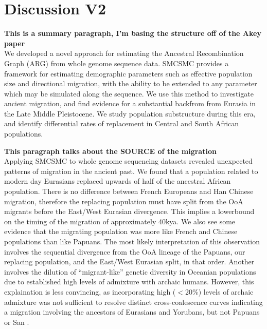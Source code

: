 \documentclass{article}
\begin{document}
\section{Discussion V2}

{\bf This is a summary paragraph, I'm basing the structure off of the Akey paper} \\
We developed a novel approach for estimating the Ancestral Recombination Graph (ARG) from whole genome sequence data. SMCSMC provides a framework for estimating demographic parameters such as effective population size and directional migration, with the ability to be extended to any parameter which may be simulated along the sequence. We use this method to investigate ancient migration, and find evidence for a substantial backfrom from Eurasia in the Late Middle Pleistocene. We study population substructure during this era, and identify differential rates of replacement in Central and South African populations. 


{\bf This paragraph talks about the SOURCE of the migration} \\
Applying SMCSMC to whole genome sequencing datasets revealed unexpected patterns of migration in the ancient past. We found that a population related to modern day Eurasians replaced upwards of half of the ancestral African population. There is no difference between French Europeans and Han Chinese migration, therefore the replacing population must have split from the OoA migrants before the East/West Eurasian divergence. This implies a lowerbound on the timing of the migration of approximately 40kya. We also see some evidence that the migrating population was more like French and Chinese populations than like Papuans. The most likely interpretation of this observation involves the sequential divergence from the OoA lineage of the Papuans, our replacing population, and the East/West Eurasian split, in that order. Another involves the dilution of ``migrant-like'' genetic diversity in Oceanian populations due to established high levels of admixture with archaic humans. However, this explaination is less convincing, as incorporating high ($<$20\%) levels of archaic admixture was not sufficient to resolve distinct cross-coalescence curves indicating a migration involving the ancestors of Eurasians and Yorubans, but not Papuans or San \cite{Malaspinas2016}. 
\end{document}
